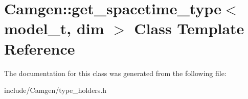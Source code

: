 \hypertarget{a00249}{\section{Camgen\-:\-:get\-\_\-spacetime\-\_\-type$<$ model\-\_\-t, dim $>$ Class Template Reference}
\label{a00249}
}


The documentation for this class was generated from the following file\-:\begin{DoxyCompactItemize}
\item 
include/\-Camgen/type\-\_\-holders.\-h\end{DoxyCompactItemize}
